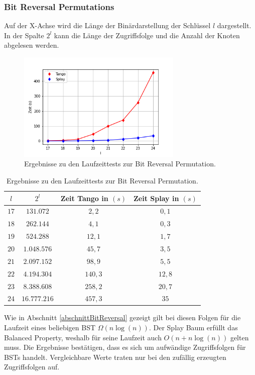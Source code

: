 \documentclass[a4paper,12pt]{article}
\begin{document}
\subsubsection{Bit Reversal Permutations}
Auf der X-Achse wird die Länge der Binärdarstellung der Schlüssel $l$ dargestellt. In der Spalte $2^l$ kann die Länge der Zugriffsfolge und die Anzahl der Knoten abgelesen werden. 
\begin{figure}[H]
	\centering
	\includegraphics[width=0.7\textwidth]{Medien/laufzeittest/diagramm/brp}
	\caption{Ergebnisse zu den Laufzeittests zur Bit Reversal Permutation.}
	\label{fig:ResultGUI}
\end{figure}
\begin{table}[H]
	\begin{center}
		\begin{tabular}[c]{|c|c|c|c|}
			\hline
			$l$ & $2^l$ &Zeit Tango in $\left(s\right)$ &Zeit Splay in $\left(s\right)$ \\
			\hline
			$17$ &	$131.072 $ &$2,2$ &$0,1$ \\
			\hline
			$18$  &$262.144 $ &$4,1$ &$0,3$  \\
			\hline
			$19$  &$524.288 $ &$12,1$ &$1,7$  \\
			\hline
			$20$  &$1.048.576 $ &$45,7$ &$3,5$  \\
			\hline
			$21$  &$2.097.152 $ &$98,9$ &$5,5$  \\
			\hline
			$22$  &$4.194.304 $ &$140,3$ &$12,8$  \\
			\hline
			$23$  &$8.388.608 $ &$258,2$ &$20,7$  \\
			\hline
			$24$  &$16.777.216$ &$457,3$ &$35$  \\
			\hline
		\end{tabular}
		\caption{Ergebnisse zu den Laufzeittests zur Bit Reversal Permutation.} 
	\end{center}
\end{table}
\noindent Wie in Abschnitt \ref{abschnittBitReversal} gezeigt gilt bei diesen Folgen für die Laufzeit eines beliebigen BST $\Omega \left(n \log\left(n\right)\right)$. Der Splay Baum erfüllt das Balanced Property, weshalb für seine Laufzeit auch $O\left(n + n \log\left(n\right)\right)$ gelten muss. Die Ergebnisse bestätigen, dass es sich um aufwändige Zugriffsfolgen für BSTs handelt. Vergleichbare Werte traten nur bei den zufällig erzeugten Zugriffsfolgen auf. \\
\end{document}
